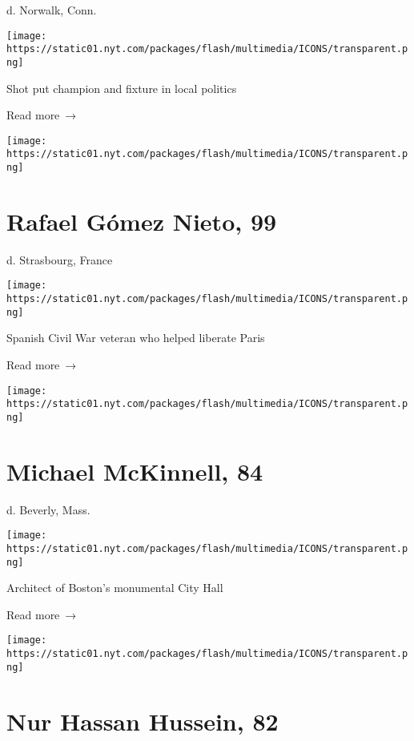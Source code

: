 d. Norwalk, Conn.

\texttt{[image: https://static01.nyt.com/packages/flash/multimedia/ICONS/transparent.png]}

Shot put champion and fixture in local politics

 Read more~→

\href{https://www.nytimes.com/2020/04/05/obituaries/rafael-gomez-nieto-dead.html}{}

\texttt{[image: https://static01.nyt.com/packages/flash/multimedia/ICONS/transparent.png]}

\hypertarget{rafael-guxf3mez-nieto-99}{%
\section{Rafael Gómez Nieto, 99}\label{rafael-guxf3mez-nieto-99}}

d. Strasbourg, France

\texttt{[image: https://static01.nyt.com/packages/flash/multimedia/ICONS/transparent.png]}

Spanish Civil War veteran who helped liberate Paris

 Read more~→

\href{https://www.nytimes.com/2020/04/04/arts/design/michael-mckinnell-dead-coronavirus.html}{}

\texttt{[image: https://static01.nyt.com/packages/flash/multimedia/ICONS/transparent.png]}

\hypertarget{michael-mckinnell-84}{%
\section{Michael McKinnell, 84}\label{michael-mckinnell-84}}

d. Beverly, Mass.

\texttt{[image: https://static01.nyt.com/packages/flash/multimedia/ICONS/transparent.png]}

Architect of Boston's monumental City Hall

 Read more~→

\href{https://www.nytimes.com/2020/04/03/obituaries/nur-hussein-dead-coronavirus.html}{}

\texttt{[image: https://static01.nyt.com/packages/flash/multimedia/ICONS/transparent.png]}

\hypertarget{nur-hassan-hussein-82}{%
\section{Nur Hassan Hussein, 82}\label{nur-hassan-hussein-82}}

